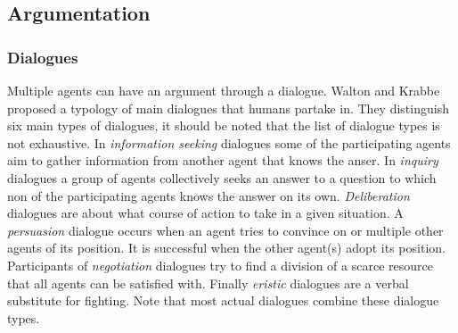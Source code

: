 \subsection{Argumentation}
\subsubsection{Dialogues}
Multiple agents can have an argument through a dialogue. Walton and
Krabbe \cite{walton1995} proposed a typology of main dialogues that humans
partake in. They distinguish six main types of dialogues, it should be noted
that the list of dialogue types is not exhaustive. In \emph{information
    seeking} dialogues some of the participating agents aim to gather
    information
from another agent that knows the anser. In \emph{inquiry} dialogues a group of
agents collectively seeks an answer to a question to which non of the
participating agents knows the answer on its own. \emph{Deliberation} dialogues
are about what course of action to take in a given situation. A
\emph{persuasion} dialogue occurs when an agent tries to convince on or
multiple other agents of its position. It is successful when the other agent(s)
adopt its position. Participants of \emph{negotiation} dialogues try to find a
division of a scarce resource that all agents can be satisfied with. Finally
\emph{eristic} dialogues are a verbal substitute for fighting. Note that most
actual dialogues combine these dialogue types.

